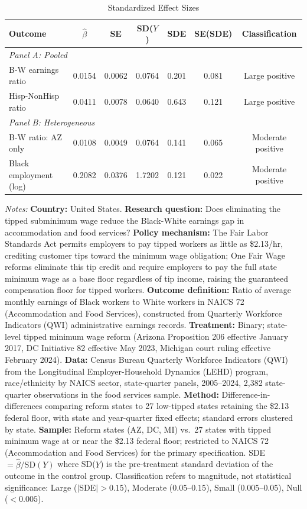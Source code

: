 \begin{table}[htbp]
\centering
\caption{Standardized Effect Sizes}
\label{tab:sde}
\begin{threeparttable}
\begin{tabular}{lcccccc}
\toprule
Outcome & $\hat{\beta}$ & SE & SD($Y$) & SDE & SE(SDE) & Classification \\
\midrule
\multicolumn{7}{l}{\textit{Panel A: Pooled}} \\
B-W earnings ratio & 0.0154 & 0.0062 & 0.0764 & 0.201 & 0.081 & Large positive \\
Hisp-NonHisp ratio & 0.0411 & 0.0078 & 0.0640 & 0.643 & 0.121 & Large positive \\
\midrule
\multicolumn{7}{l}{\textit{Panel B: Heterogeneous}} \\
B-W ratio: AZ only & 0.0108 & 0.0049 & 0.0764 & 0.141 & 0.065 & Moderate positive \\
Black employment (log) & 0.2082 & 0.0376 & 1.7202 & 0.121 & 0.022 & Moderate positive \\
\bottomrule
\end{tabular}
\begin{tablenotes}[flushleft]\footnotesize
\item \textit{Notes:} \textbf{Country:} United States. \textbf{Research question:} Does eliminating the tipped subminimum wage reduce the Black-White earnings gap in accommodation and food services? \textbf{Policy mechanism:} The Fair Labor Standards Act permits employers to pay tipped workers as little as \$2.13/hr, crediting customer tips toward the minimum wage obligation; One Fair Wage reforms eliminate this tip credit and require employers to pay the full state minimum wage as a base floor regardless of tip income, raising the guaranteed compensation floor for tipped workers. \textbf{Outcome definition:} Ratio of average monthly earnings of Black workers to White workers in NAICS 72 (Accommodation and Food Services), constructed from Quarterly Workforce Indicators (QWI) administrative earnings records. \textbf{Treatment:} Binary; state-level tipped minimum wage reform (Arizona Proposition 206 effective January 2017, DC Initiative 82 effective May 2023, Michigan court ruling effective February 2024). \textbf{Data:} Census Bureau Quarterly Workforce Indicators (QWI) from the Longitudinal Employer-Household Dynamics (LEHD) program, race/ethnicity by NAICS sector, state-quarter panels, 2005--2024, 2,382 state-quarter observations in the food services sample. \textbf{Method:} Difference-in-differences comparing reform states to 27 low-tipped states retaining the \$2.13 federal floor, with state and year-quarter fixed effects; standard errors clustered by state. \textbf{Sample:} Reform states (AZ, DC, MI) vs.\ 27 states with tipped minimum wage at or near the \$2.13 federal floor; restricted to NAICS 72 (Accommodation and Food Services) for the primary specification. SDE $= \hat{\beta} / \text{SD}(Y)$ where SD($Y$) is the pre-treatment standard deviation of the outcome in the control group. Classification refers to magnitude, not statistical significance: Large ($|$SDE$| > 0.15$), Moderate ($0.05$--$0.15$), Small ($0.005$--$0.05$), Null ($< 0.005$).

\end{tablenotes}
\end{threeparttable}
\end{table}
